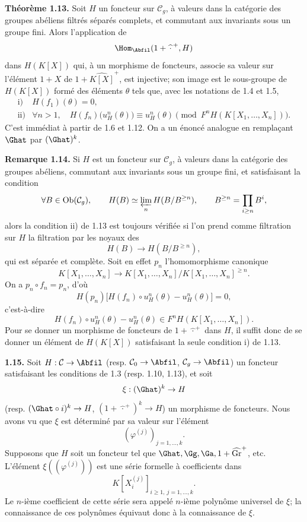 \documentclass[11pt]{article}
\begin{document}
\textbf{Théorème 1.13.} Soit \(H\) un foncteur sur \(\mathcal C_g\), à valeurs dans la catégorie des groupes abéliens filtrés séparés complets, et commutant aux invariants sous un groupe fini. Alors l'application de
\[
  \Hom_{\Abfil}(1+\widehat{\,\cdot\,}^{+},H)
\]
dans \(H(K[X])\) qui, à un morphisme de foncteurs, associe sa valeur sur l'élément \(1+X\) de \(1+\widehat{K[X]}^+\), est injective; son image est le sous-groupe de \(H(K[X])\) formé des éléments \(\theta\) tels que, avec les notations de 1.4 et 1.5,
\[
\begin{array}{ll}
\text{i)}& H(f_1)(\theta)=0,\\[0.3em]
\text{ii)}& \forall n>1,\quad
H(f_n)\bigl(u_H^n(\theta)\bigr)\equiv u_H^n(\theta)
\pmod{F^nH(K[X_1,\ldots,X_n])}.
\end{array}
\]
C'est immédiat à partir de 1.6 et 1.12. On a un énoncé analogue en remplaçant \(\Ghat\) par \((\Ghat)^k\).

\textbf{Remarque 1.14.} Si \(H\) est un foncteur sur \(\mathcal C_g\), à valeurs dans la catégorie des groupes abéliens, commutant aux invariants sous un groupe fini, et satisfaisant la condition
\[
  \forall B\in\operatorname{Ob}(\mathcal C_g),\qquad
  H(B)\simeq\varprojlim_n H(B/B^{\geq n}),\qquad
  B^{\geq n}=\prod_{i\geq n}B^i,
\]
alors la condition ii) de 1.13 est toujours vérifiée si l'on prend comme filtration sur \(H\) la filtration par les noyaux des
\[
  H(B)\longrightarrow H(B/B^{\geq n}),
\]
qui est séparée et complète. Soit en effet \(p_n\) l'homomorphisme canonique
\[
  K[X_1,\ldots,X_n]\longrightarrow K[X_1,\ldots,X_n]/K[X_1,\ldots,X_n]^{\geq n}.
\]
On a \(p_n\circ f_n=p_n\), d'où
\[
  H(p_n)\bigl[H(f_n)\circ u_H^n(\theta)-u_H^n(\theta)\bigr]=0,
\]
c'est-à-dire
\[
  H(f_n)\circ u_H^n(\theta)-u_H^n(\theta)
  \in F^nH(K[X_1,\ldots,X_n]).
\]
Pour se donner un morphisme de foncteurs de \(1+\widehat{\,\cdot\,}^{+}\) dans \(H\), il suffit donc de se donner un élément de \(H(K[X])\) satisfaisant la seule condition i) de 1.13.

\textbf{1.15.} Soit \(H:\mathcal C\to\Abfil\) (resp. \(\mathcal C_0\to\Abfil\), \(\mathcal C_g\to\Abfil\)) un foncteur satisfaisant les conditions de 1.3 (resp. 1.10, 1.13), et soit
\[
  \xi:(\Ghat)^k\to H
\]
(resp. \((\Ghat\circ i)^k\to H\), \((1+\widehat{\,\cdot\,}^{+})^k\to H\)) un morphisme de foncteurs. Nous avons vu que \(\xi\) est déterminé par sa valeur sur l'élément
\[
  (\varphi^{(j)})_{j=1,\ldots,k}.
\]
Supposons que \(H\) soit un foncteur tel que \(\Ghat,\Gg,\Ga,1+\widehat{\operatorname{Gr}}^{+}\), etc. L'élément \(\xi((\varphi^{(j)}))\) est une série formelle à coefficients dans
\[
  K[X_i^{(j)}]_{i\geq1,\ j=1,\ldots,k}.
\]
Le \(n\)-ième coefficient de cette série sera appelé \(n\)-ième polynôme universel de \(\xi\); la connaissance de ces polynômes équivaut donc à la connaissance de \(\xi\).
\end{document}
